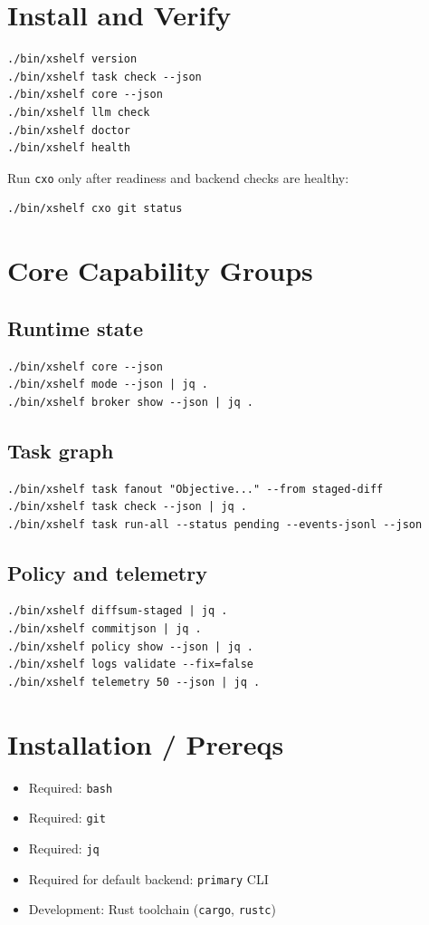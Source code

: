 \documentclass[11pt]{article}
\begin{document}
\section*{Install and Verify}
\begin{lstlisting}[style=cx]
./bin/xshelf version
./bin/xshelf task check --json
./bin/xshelf core --json
./bin/xshelf llm check
./bin/xshelf doctor
./bin/xshelf health
\end{lstlisting}

Run \texttt{cxo} only after readiness and backend checks are healthy:
\begin{lstlisting}[style=cx]
./bin/xshelf cxo git status
\end{lstlisting}

\section*{Core Capability Groups}
\subsection*{Runtime state}
\begin{lstlisting}[style=cx]
./bin/xshelf core --json
./bin/xshelf mode --json | jq .
./bin/xshelf broker show --json | jq .
\end{lstlisting}

\subsection*{Task graph}
\begin{lstlisting}[style=cx]
./bin/xshelf task fanout "Objective..." --from staged-diff
./bin/xshelf task check --json | jq .
./bin/xshelf task run-all --status pending --events-jsonl --json
\end{lstlisting}

\subsection*{Policy and telemetry}
\begin{lstlisting}[style=cx]
./bin/xshelf diffsum-staged | jq .
./bin/xshelf commitjson | jq .
./bin/xshelf policy show --json | jq .
./bin/xshelf logs validate --fix=false
./bin/xshelf telemetry 50 --json | jq .
\end{lstlisting}

\section*{Installation / Prereqs}
\begin{itemize}
  \item Required: \texttt{bash}
  \item Required: \texttt{git}
  \item Required: \texttt{jq}
  \item Required for default backend: \texttt{primary} CLI
  \item Development: Rust toolchain (\texttt{cargo}, \texttt{rustc})
\end{itemize}
\end{document}
